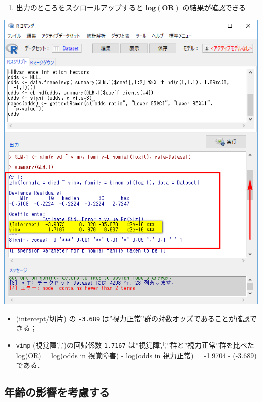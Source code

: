 \documentclass[]{problemset}
\providecommand{\tightlist}{%
  \setlength{\itemsep}{0pt}\setlength{\parskip}{0pt}}
\begin{document}
\begin{enumerate}
\def\labelenumi{\arabic{enumi}.}
\setcounter{enumi}{9}
\tightlist
\item
  出力のところをスクロールアップすると \(\mathbf{log(OR)}\)
  の結果が確認できる
\end{enumerate}

\begin{center}\includegraphics[width=0.52\linewidth]{pic/logstic09} \end{center}

\begin{itemize}
\tightlist
\item
  (intercept/切片) の \texttt{-3.689}
  は''視力正常''群の対数オッズであることが確認できる；
\item
  \texttt{vimp} (視覚障害)の回帰係数 \texttt{1.7167}
  は''視覚障害''群と''視力正常''群を比べた log(OR) = log(odds in
  視覚障害) - log(odds in 視力正常) = -1.9704 - (-3.689)である．
\end{itemize}

\subsection{年齢の影響を考慮する}
\end{document}
